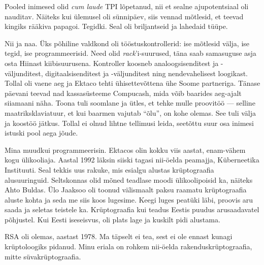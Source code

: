 Pooled inimesed olid \emph{cum laude} TPI lõpetanud, nii et sealne 
ajupotentsiaal oli nauditav. Näiteks kui ülemusel oli sünnipäev, siis
vennad mõtlesid, et teevad kingiks rääkiva papagoi. Tegidki. Seal oli 
briljantseid ja lahedaid tüüpe. 


Nii ja naa. Üks põhiline valdkond oli 
tööstuskontrollerid: ise mõtlesid välja, ise tegid, ise programmeerisid. Need olid 
\emph{rack}'i-suurused, täna saab samasuguse asja osta Hiinast 
kiibisuurusena. Kontroller koosneb analoogsisenditest ja 
-väljunditest, digitaalsisenditest ja -väljunditest ning nendevahelisest 
loogikast. 
Tollal oli vaene aeg ja Ektaco tehti ühisettevõttena ühe Soome partneriga. Tänase 
päevani teevad nad kassasüsteeme Compucash, mida võib 
baarides aeg-ajalt siiamaani näha. Toona tuli soomlane ja ütles, et tehke mulle 
proovitöö --- selline maatriksklaviatuur, et kui baarmen vajutab \enquote{õlu}, on 
kohe olemas. See tuli välja ja koostöö jätkus. Tollal ei olnud lihtne 
tellimusi leida, seetõttu suur osa
inimesi istuski pool aega jõude. 


Mina muudkui programmeerisin. Ektacos olin kokku viis aastat, enam-vähem kogu
ülikooliaja. Aastal 1992 läksin siiski tagasi
nii-öelda peamajja, Küberneetika Instituuti. Seal tekkis uus rakuke, mis esialgu alustas krüptograafia alusuuringuid. Seltskonnas 
olid mõned teadlase moodi ülikoolipoisid ka, näiteks Ahto Buldas. Ülo Jaaksoo oli 
toonud välismaalt paksu raamatu krüptograafia aluste kohta ja seda me siis koos 
lugesime. Keegi luges peatüki läbi, proovis aru saada ja seletas 
teistele ka. Krüptograafia kui teadus Eestis puudus arusaadavatel põhjustel. Kui Eesti
iseseisvus, oli plats lage ja kuskilt pidi alustama.


RSA oli olemas, aastast 1978. Ma täpselt ei tea, sest ei ole ennast 
kunagi krüptoloogiks pidanud. Minu eriala on rohkem nii-öelda 
rakenduskrüptograafia, mitte süvakrüptograafia.


